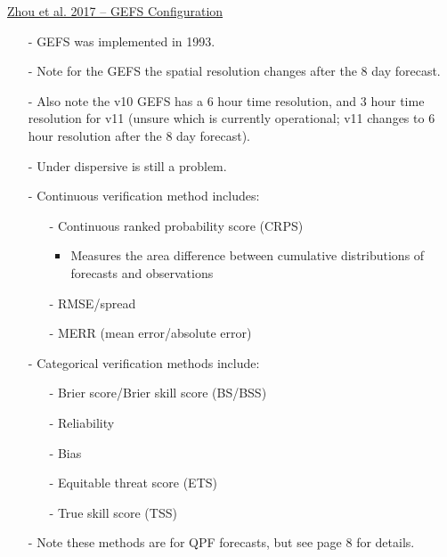 \documentclass[12pt, letterpaper]{article}
\begin{document}
    \underline{Zhou et al. 2017 -- GEFS Configuration}
    \begin{itemize}
    	\item[-] GEFS was implemented in 1993.
    	\item[-] Note for the GEFS the spatial resolution changes after the 8 day forecast.
    	\item[-] Also note the v10 GEFS has a 6 hour time resolution, and 3 hour time resolution for v11
    	         (unsure which is currently operational; v11 changes to 6 hour resolution after the 8 day
    	         forecast).
    	\item[-] Under dispersive is still a problem.
    	\item[-] Continuous verification method includes:
    	\begin{itemize}
    		\item[-] Continuous ranked probability score (CRPS)
    		\begin{itemize}
    			\item Measures the area difference between cumulative distributions of forecasts and
    			      observations
    		\end{itemize}
    	    \item[-] RMSE/spread
    	    \item[-] MERR (mean error/absolute error)
    	\end{itemize}
        \item[-] Categorical verification methods include:
        \begin{itemize}
        	\item[-] Brier score/Brier skill score (BS/BSS)
        	\item[-] Reliability
        	\item[-] Bias
        	\item[-] Equitable threat score (ETS)
        	\item[-] True skill score (TSS)
        \end{itemize}
        \item[-] Note these methods are for QPF forecasts, but see page 8 for details.
    \end{itemize}
\end{document}
